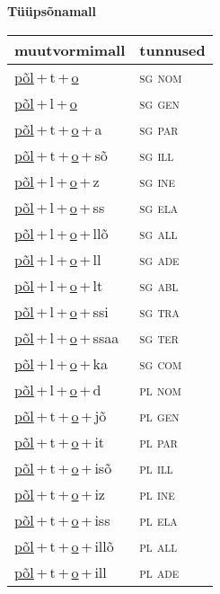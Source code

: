 
\vspace{1.8em}
\begin{minipage}{\textwidth}
\textbf{Tüüpsõnamall \,}\\

\begin{sideways}
\begin{tabular}{l l}
muutvormimall & tunnused \\
\hline
\underline{põl}\,+\,t\,+\,\underline{o} & \textsc{ sg nom } \\
\underline{põl}\,+\,l\,+\,\underline{o} & \textsc{ sg gen } \\
\underline{põl}\,+\,t\,+\,\underline{o}\,+\,a & \textsc{ sg par } \\
\underline{põl}\,+\,t\,+\,\underline{o}\,+\,sõ & \textsc{ sg ill } \\
\underline{põl}\,+\,l\,+\,\underline{o}\,+\,z & \textsc{ sg ine } \\
\underline{põl}\,+\,l\,+\,\underline{o}\,+\,ss & \textsc{ sg ela } \\
\underline{põl}\,+\,l\,+\,\underline{o}\,+\,llõ & \textsc{ sg all } \\
\underline{põl}\,+\,l\,+\,\underline{o}\,+\,ll & \textsc{ sg ade } \\
\underline{põl}\,+\,l\,+\,\underline{o}\,+\,lt & \textsc{ sg abl } \\
\underline{põl}\,+\,l\,+\,\underline{o}\,+\,ssi & \textsc{ sg tra } \\
\underline{põl}\,+\,l\,+\,\underline{o}\,+\,ssaa & \textsc{ sg ter } \\
\underline{põl}\,+\,l\,+\,\underline{o}\,+\,ka & \textsc{ sg com } \\
\underline{põl}\,+\,l\,+\,\underline{o}\,+\,d & \textsc{ pl nom } \\
\underline{põl}\,+\,t\,+\,\underline{o}\,+\,jõ & \textsc{ pl gen } \\
\underline{põl}\,+\,t\,+\,\underline{o}\,+\,it & \textsc{ pl par } \\
\underline{põl}\,+\,t\,+\,\underline{o}\,+\,isõ & \textsc{ pl ill } \\
\underline{põl}\,+\,t\,+\,\underline{o}\,+\,iz & \textsc{ pl ine } \\
\underline{põl}\,+\,t\,+\,\underline{o}\,+\,iss & \textsc{ pl ela } \\
\underline{põl}\,+\,t\,+\,\underline{o}\,+\,illõ & \textsc{ pl all } \\
\underline{põl}\,+\,t\,+\,\underline{o}\,+\,ill & \textsc{ pl ade } \\

\end{tabular}
\end{sideways}
\end{minipage}
